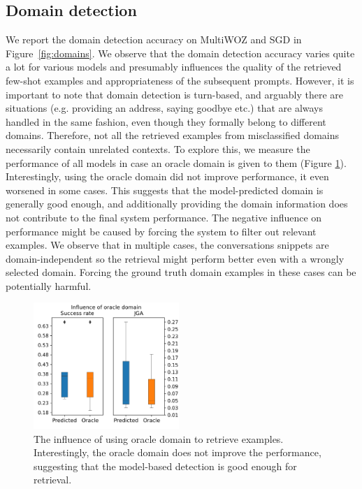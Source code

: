 \subsection{Domain detection}
\label{subsec:domain}
We report the domain detection accuracy on MultiWOZ and SGD
in Figure~\ref{fig:domains}.
We observe that the domain detection accuracy varies quite a lot for various models and presumably influences the quality of the retrieved few-shot examples and appropriateness of the subsequent prompts.
However, it is important to note that domain detection is turn-based, and arguably there are situations (e.g. providing an address, saying goodbye etc.) that are always handled in the same fashion, even though they formally belong to different domains.
Therefore, not all the retrieved examples from misclassified domains necessarily contain unrelated contexts.
To explore this, we measure the performance of all models in case an oracle domain is given to them (Figure \ref{fig:oracle_domains}).
Interestingly, using the oracle domain did not improve performance, it even worsened in some cases.
This suggests that the model-predicted domain is generally good enough, and additionally providing the domain information does not contribute to the final system performance.
The negative influence on performance might be caused by forcing the system to filter out relevant examples.
We observe that in multiple cases, the conversations snippets are domain-independent so the retrieval might perform better even with a wrongly selected domain.
Forcing the ground truth domain examples in these cases can be potentially harmful.

\begin{figure}[h]
    \centering
    \includegraphics[width=0.49\textwidth]{images/oracle_domains.png}
    \caption{The influence of using oracle domain to retrieve examples. Interestingly, the oracle domain does not improve the performance, suggesting that the model-based detection is good enough for retrieval.}
    \label{fig:oracle_domains}
\end{figure}

